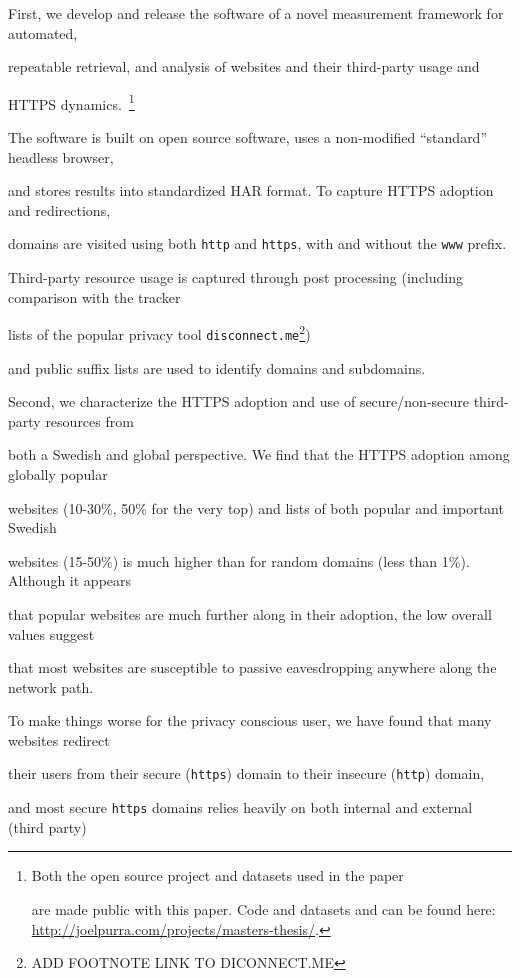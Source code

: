 \documentclass{sig-alternate-10pt}
\begin{document}
First, we develop and release the software of a novel measurement framework for automated, 

repeatable retrieval, and analysis of websites and their third-party usage and 

HTTPS dynamics.~\footnote{Both the open source project and datasets used in the paper 

are made public with this paper.   Code and datasets and can be found here: \url{http://joelpurra.com/projects/masters-thesis/}.}  

The software is built on open source software, uses a non-modified ``standard'' headless browser, 

and stores results into standardized HAR format.  To capture HTTPS adoption and redirections, 

domains are visited using both \texttt{http} and \texttt{https}, with and without the \texttt{www} prefix. 

Third-party resource usage is captured through post processing (including comparison with the tracker 

lists of the popular privacy tool \texttt{disconnect.me}\footnote{ADD FOOTNOTE LINK TO DICONNECT.ME}) 

and public suffix lists are used to identify domains and subdomains.



Second, we characterize the HTTPS adoption and use of secure/non-secure third-party resources from 

both a Swedish and global perspective.  We find that the HTTPS adoption among globally popular 

websites (10-30\%, 50\% for the very top) and lists of both popular and important Swedish 

websites (15-50\%) is much higher than for random domains (less than 1\%). Although it appears 

that popular websites are much further along in their adoption, the low overall values suggest 

that most websites are susceptible to passive eavesdropping anywhere along the network path.  

To make things worse for the privacy conscious user, we have found that many websites redirect 

their users from their secure (\texttt{https}) domain to their insecure (\texttt{http}) domain, 

and most secure \texttt{https} domains relies heavily on both internal and external (third party) 
\end{document}
